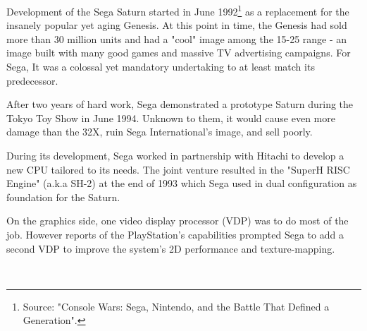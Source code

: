 \begin{figure}{
\centering {}}
\end{figure}
Development of the Sega Saturn started in June 1992\footnote{Source: "Console Wars: Sega, Nintendo, and the Battle That Defined a Generation".} as a replacement for the insanely popular yet aging Genesis. At this point in time, the Genesis had sold more than 30 million units and had a "cool" image among the 15-25 range - an image built with many good games and massive TV advertising campaigns. For Sega, It was a colossal yet mandatory undertaking to at least match its predecessor.\\
\label{saturn_port}
\par
After two years of hard work, Sega demonstrated a prototype Saturn during the Tokyo Toy Show in June 1994. Unknown to them, it would cause even more damage than the 32X, ruin Sega International's image, and sell poorly.\\
\par
During its development, Sega worked in partnership with Hitachi to develop a new CPU tailored to its needs. The joint venture resulted in the "SuperH RISC Engine" (a.k.a SH-2) at the end of 1993 which Sega used in dual configuration as foundation for the Saturn.\\
\par
 On the graphics side, one video display processor (VDP) was to do most of the job. However reports of the PlayStation's capabilities prompted Sega to add a second VDP to improve the system's 2D performance and texture-mapping.\\
\par
{}\\

